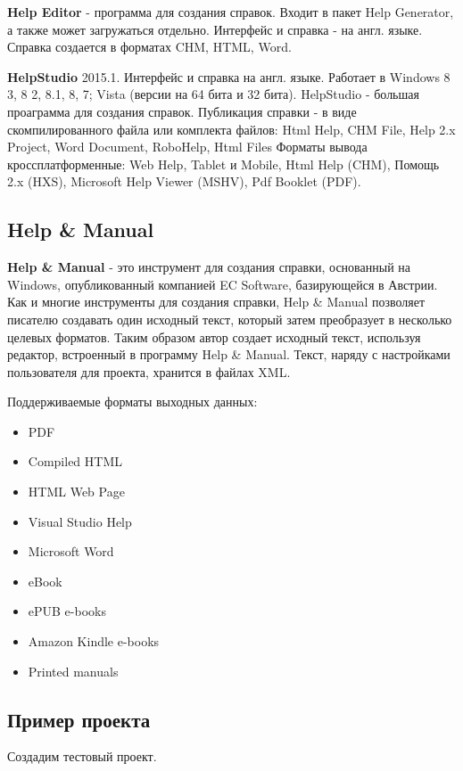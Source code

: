 		\textbf{Help Editor} - программа для создания справок. Входит в пакет Help Generator, а также может загружаться отдельно.
		Интерфейс и справка - на англ. языке.
		Справка создается в форматах CHM, HTML, Word.
		
		\textbf{HelpStudio} 2015.1. Интерфейс и справка на англ. языке.
		Работает в Windows  8 3, 8 2, 8.1, 8, 7;  Vista (версии на 64 бита и 32 бита).
		HelpStudio - большая проаграмма для создания справок. 
		Публикация справки - в виде скомпилированного файла или комплекта файлов:
		Html Help, CHM File, Help 2.x Project, Word Document, RoboHelp, Html Files 
		Форматы вывода кроссплатформенные: Web Help, Tablet и Mobile, Html Help (CHM),  Помощь 2.x (HXS), Microsoft Help Viewer (MSHV),  Pdf Booklet (PDF).
	
		\subsection{Help \& Manual}
			\textbf{Help \& Manual} - это инструмент для создания справки, основанный на Windows, опубликованный компанией EC Software, базирующейся в Австрии. Как и многие инструменты для создания справки, Help \& Manual позволяет писателю создавать один исходный текст, который затем преобразует в несколько целевых форматов. Таким образом автор создает исходный текст, используя редактор, встроенный в программу Help \& Manual. Текст, наряду с настройками пользователя для проекта, хранится в файлах XML.
			
			Поддерживаемые форматы выходных данных:
			\begin{itemize}
				\item PDF
				\item Compiled HTML
				\item HTML Web Page
				\item Visual Studio Help
				\item Microsoft Word
				\item eBook 
				\item ePUB e-books
				\item Amazon Kindle e-books
				\item Printed manuals
			\end{itemize}
		
		\subsection{Пример проекта}
		
		Создадим тестовый проект.
			
